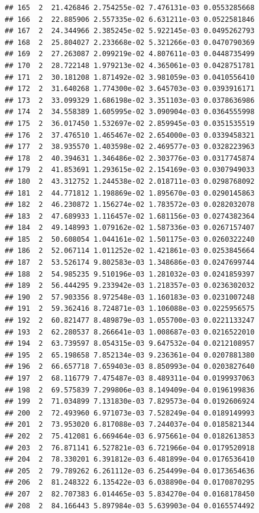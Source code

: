 \documentclass[article]{jss}\usepackage[]{graphicx}\usepackage[]{xcolor}
\makeatletter
\newenvironment{kframe}{%
 \def\at@end@of@kframe{}%
 \ifinner\ifhmode%
  \def\at@end@of@kframe{\end{minipage}}%
  \begin{minipage}{\columnwidth}%
 \fi\fi%
 \def\FrameCommand##1{\hskip\@totalleftmargin \hskip-\fboxsep
 \colorbox{shadecolor}{##1}\hskip-\fboxsep
     \hskip-\linewidth \hskip-\@totalleftmargin \hskip\columnwidth}%
 \MakeFramed {\advance\hsize-\width
   \@totalleftmargin\z@ \linewidth\hsize
   \@setminipage}}%
 {\par\unskip\endMakeFramed%
 \at@end@of@kframe}
\newenvironment{knitrout}{}{} %
\makeatother
\begin{document}
\begin{knitrout}
\begin{kframe}
\begin{verbatim}
## 165  2  21.426846 2.754255e-02 7.476131e-03 0.0553285668
## 166  2  22.885906 2.557335e-02 6.631211e-03 0.0522581846
## 167  2  24.344966 2.385245e-02 5.922145e-03 0.0495262793
## 168  2  25.804027 2.233668e-02 5.321266e-03 0.0470790369
## 169  2  27.263087 2.099219e-02 4.807611e-03 0.0448735499
## 170  2  28.722148 1.979213e-02 4.365061e-03 0.0428751781
## 171  2  30.181208 1.871492e-02 3.981059e-03 0.0410556410
## 172  2  31.640268 1.774300e-02 3.645703e-03 0.0393916171
## 173  2  33.099329 1.686198e-02 3.351103e-03 0.0378636986
## 174  2  34.558389 1.605995e-02 3.090904e-03 0.0364555998
## 175  2  36.017450 1.532697e-02 2.859945e-03 0.0351535519
## 176  2  37.476510 1.465467e-02 2.654000e-03 0.0339458321
## 177  2  38.935570 1.403598e-02 2.469577e-03 0.0328223963
## 178  2  40.394631 1.346486e-02 2.303776e-03 0.0317745874
## 179  2  41.853691 1.293615e-02 2.154169e-03 0.0307949033
## 180  2  43.312752 1.244538e-02 2.018711e-03 0.0298768092
## 181  2  44.771812 1.198869e-02 1.895670e-03 0.0290145863
## 182  2  46.230872 1.156274e-02 1.783572e-03 0.0282032078
## 183  2  47.689933 1.116457e-02 1.681156e-03 0.0274382364
## 184  2  49.148993 1.079162e-02 1.587336e-03 0.0267157407
## 185  2  50.608054 1.044161e-02 1.501175e-03 0.0260322240
## 186  2  52.067114 1.011252e-02 1.421861e-03 0.0253845664
## 187  2  53.526174 9.802583e-03 1.348686e-03 0.0247699744
## 188  2  54.985235 9.510196e-03 1.281032e-03 0.0241859397
## 189  2  56.444295 9.233942e-03 1.218357e-03 0.0236302032
## 190  2  57.903356 8.972548e-03 1.160183e-03 0.0231007248
## 191  2  59.362416 8.724871e-03 1.106088e-03 0.0225956575
## 192  2  60.821477 8.489879e-03 1.055700e-03 0.0221133247
## 193  2  62.280537 8.266641e-03 1.008687e-03 0.0216522010
## 194  2  63.739597 8.054315e-03 9.647532e-04 0.0212108957
## 195  2  65.198658 7.852134e-03 9.236361e-04 0.0207881380
## 196  2  66.657718 7.659403e-03 8.850993e-04 0.0203827640
## 197  2  68.116779 7.475487e-03 8.489311e-04 0.0199937063
## 198  2  69.575839 7.299806e-03 8.149409e-04 0.0196199836
## 199  2  71.034899 7.131830e-03 7.829573e-04 0.0192606924
## 200  2  72.493960 6.971073e-03 7.528249e-04 0.0189149993
## 201  2  73.953020 6.817088e-03 7.244037e-04 0.0185821344
## 202  2  75.412081 6.669464e-03 6.975661e-04 0.0182613853
## 203  2  76.871141 6.527821e-03 6.721966e-04 0.0179520918
## 204  2  78.330201 6.391812e-03 6.481899e-04 0.0176536410
## 205  2  79.789262 6.261112e-03 6.254499e-04 0.0173654636
## 206  2  81.248322 6.135422e-03 6.038890e-04 0.0170870295
## 207  2  82.707383 6.014465e-03 5.834270e-04 0.0168178450
## 208  2  84.166443 5.897984e-03 5.639903e-04 0.0165574492

\end{verbatim}
\end{kframe}
\end{knitrout}
\end{document}
